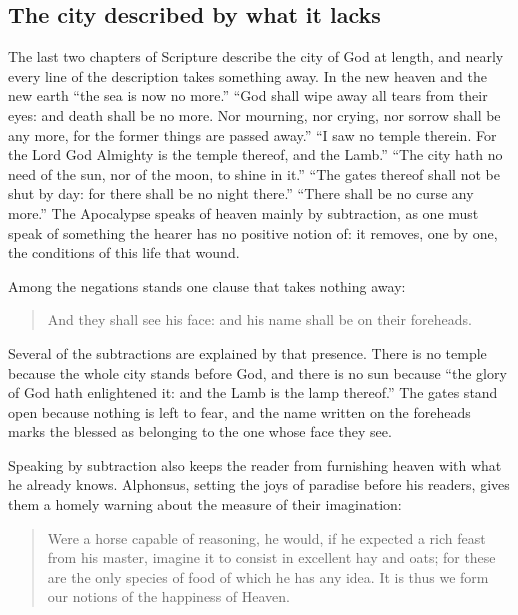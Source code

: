 \subsection{The city described by what it lacks}

The last two chapters of Scripture describe the city of God at length, and nearly every line of the description takes something away. In the new heaven and the new earth ``the sea is now no more.'' ``God shall wipe away all tears from their eyes: and death shall be no more. Nor mourning, nor crying, nor sorrow shall be any more, for the former things are passed away.'' ``I saw no temple therein. For the Lord God Almighty is the temple thereof, and the Lamb.'' ``The city hath no need of the sun, nor of the moon, to shine in it.'' ``The gates thereof shall not be shut by day: for there shall be no night there.'' ``There shall be no curse any more.'' The Apocalypse speaks of heaven mainly by subtraction, as one must speak of something the hearer has no positive notion of: it removes, one by one, the conditions of this life that wound.

Among the negations stands one clause that takes nothing away:

\begin{quote}
And they shall see his face: and his name shall be on their foreheads.
\end{quote}

Several of the subtractions are explained by that presence. There is no temple because the whole city stands before God, and there is no sun because ``the glory of God hath enlightened it: and the Lamb is the lamp thereof.'' The gates stand open because nothing is left to fear, and the name written on the foreheads marks the blessed as belonging to the one whose face they see.

Speaking by subtraction also keeps the reader from furnishing heaven with what he already knows. Alphonsus, setting the joys of paradise before his readers, gives them a homely warning about the measure of their imagination:

\begin{quote}
Were a horse capable of reasoning, he would, if he expected a rich feast from his master, imagine it to consist in excellent hay and oats; for these are the only species of food of which he has any idea. It is thus we form our notions of the happiness of Heaven.
\end{quote}

